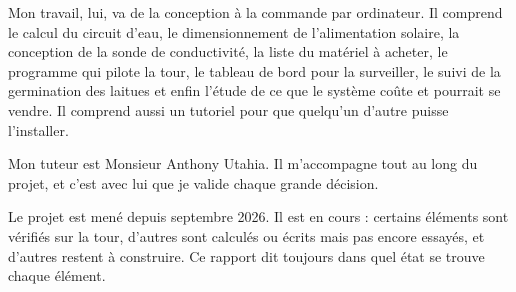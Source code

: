 \documentclass[11pt,a4paper]{article}
\newcounter{annexe}\newcounter{schema}
\begin{document}
Mon travail, lui, va de la conception à la commande par ordinateur. Il comprend le calcul du circuit d'eau, le dimensionnement de l'alimentation solaire, la conception de la sonde de conductivité, la liste du matériel à acheter, le programme qui pilote la tour, le tableau de bord pour la surveiller, le suivi de la germination des laitues et enfin l'étude de ce que le système coûte et pourrait se vendre. Il comprend aussi un tutoriel pour que quelqu'un d'autre puisse l'installer.

Mon tuteur est Monsieur Anthony Utahia. Il m'accompagne tout au long du projet, et c'est avec lui que je valide chaque grande décision.

\begin{aretenir}
Le projet est mené depuis septembre 2026. Il est en cours : certains éléments sont vérifiés sur la tour, d'autres sont calculés ou écrits mais pas encore essayés, et d'autres restent à construire. Ce rapport dit toujours dans quel état se trouve chaque élément.
\end{aretenir}






















\end{document}
